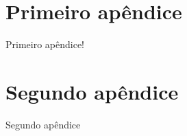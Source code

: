 
\apendices

\chapter{Primeiro apêndice}
Primeiro apêndice!

\chapter{Segundo apêndice}
Segundo apêndice